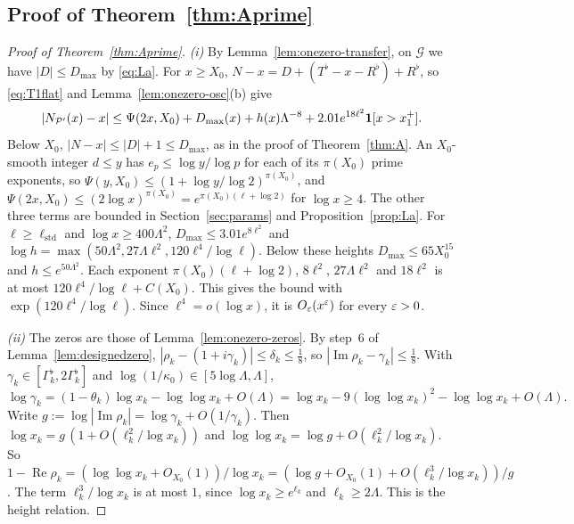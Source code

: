 \subsection{Proof of Theorem~\ref{thm:Aprime}}
\begin{proof}[Proof of Theorem~\ref{thm:Aprime}]
\emph{(i)} By Lemma~\ref{lem:onezero-transfer}, on $\mathcal G$ we have $|D|\le D_{\max}$ by \eqref{eq:La}. For $x\ge X_0$,
$N-x=D+(T^\flat-x-R^\flat)+R^\flat$, so \eqref{eq:T1flat} and Lemma~\ref{lem:onezero-osc}(b) give
\[
  |N_{\mathcal{P}'}(x)-x|\le\Psi(2x,X_0)+D_{\max}(x)+h(x)\Lambda^{-8}+2.01e^{18\ell^2}\mathbf 1[x>x_1^+].
\]
Below $X_0$, $|N-x|\le|D|+1\le D_{\max}$, as in the proof of Theorem~\ref{thm:A}. An $X_0$-smooth integer $d\le y$ has
$e_p\le\log y/\log p$ for each of its $\pi(X_0)$ prime exponents, so
$\Psi(y,X_0)\le(1+\log y/\log2)^{\pi(X_0)}$, and $\Psi(2x,X_0)\le(2\log x)^{\pi(X_0)}=e^{\pi(X_0)(\ell+\log2)}$ for $\log x\ge4$. The other
three terms are bounded in Section~\ref{sec:params} and Proposition~\ref{prop:La}. For $\ell\ge\ell_{\mathrm{std}}$ and $\log x\ge400\Lambda^2$,
$D_{\max}\le3.01e^{8\ell^2}$ and $\log h=\max(50\Lambda^2,27\Lambda\ell^2,120\ell^4/\log\ell)$. Below these heights $D_{\max}\le65X_0^{15}$ and
$h\le e^{50\Lambda^2}$. Each exponent $\pi(X_0)(\ell+\log2)$, $8\ell^2$, $27\Lambda\ell^2$ and $18\ell^2$ is at most
$120\ell^4/\log\ell+C(X_0)$. This gives the bound with $\exp(120\ell^4/\log\ell)$. Since $\ell^4=o(\log x)$, it is $O_\varepsilon(x^\varepsilon)$ for
every $\varepsilon>0$.

\emph{(ii)} The zeros are those of Lemma~\ref{lem:onezero-zeros}. By step~6 of Lemma~\ref{lem:designedzero},
$|\rho_k-(1+i\gamma_k)|\le\delta_k\le\frac18$, so $|\operatorname{Im}\rho_k-\gamma_k|\le\frac18$. With $\gamma_k\in[\Gamma_k^\flat,2\Gamma_k^\flat]$ and
$\log(1/\kappa_0)\in[5\log\Lambda,\Lambda]$,
\[
  \log\gamma_k=(1-\theta_k)\log x_k-\log\log x_k+O(\Lambda)=\log x_k-9(\log\log x_k)^2-\log\log x_k+O(\Lambda).
\]
Write $g:=\log|\operatorname{Im}\rho_k|=\log\gamma_k+O(1/\gamma_k)$. Then $\log x_k=g\,(1+O(\ell_k^2/\log x_k))$ and
$\log\log x_k=\log g+O(\ell_k^2/\log x_k)$. So $1-\operatorname{Re}\rho_k=(\log\log x_k+O_{X_0}(1))/\log x_k=(\log g+O_{X_0}(1)+O(\ell_k^3/\log x_k))/g$.
The term $\ell_k^3/\log x_k$ is at most $1$, since $\log x_k\ge e^{\ell_k}$ and $\ell_k\ge2\Lambda$. This is the height relation.
\end{proof}

